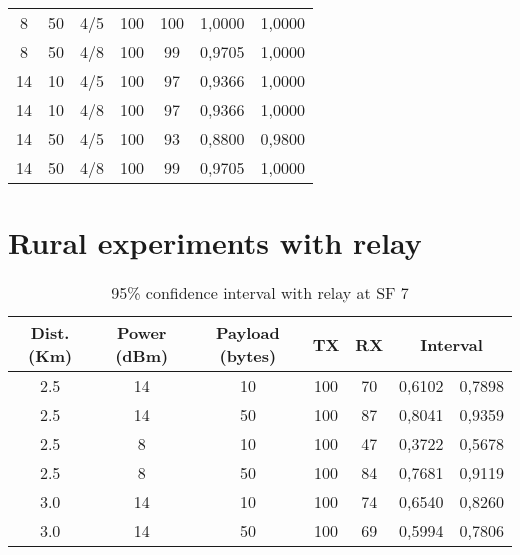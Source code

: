 \begin{table}[H]
\begin{tabular}{@{}ccccccc@{}}
8                                                     & 50                                                        & 4/5 & 100 & 100 & 1,0000        & 1,0000       \\
8                                                     & 50                                                        & 4/8 & 100 & 99  & 0,9705        & 1,0000       \\
14                                                    & 10                                                        & 4/5 & 100 & 97  & 0,9366        & 1,0000       \\
14                                                    & 10                                                        & 4/8 & 100 & 97  & 0,9366        & 1,0000       \\
14                                                    & 50                                                        & 4/5 & 100 & 93  & 0,8800        & 0,9800       \\
14                                                    & 50                                                        & 4/8 & 100 & 99  & 0,9705        & 1,0000       \\ \bottomrule
\end{tabular}
\end{table}

\newpage
\section{Rural experiments with relay}

\begin{table}[H]
\centering
\caption{95\% confidence interval with relay at SF 7}
\label{tab:cisf7relay}
\begin{tabular}{@{}ccccccc@{}}
\toprule
Dist. (Km) & Power (dBm) & Payload (bytes) & TX  & RX & \multicolumn{2}{c}{Interval} \\ \midrule
2.5           & 14          & 10              & 100 & 70 & 0,6102        & 0,7898       \\
2.5           & 14          & 50              & 100 & 87 & 0,8041        & 0,9359       \\
2.5           & 8           & 10              & 100 & 47 & 0,3722        & 0,5678       \\
2.5           & 8           & 50              & 100 & 84 & 0,7681        & 0,9119       \\
3.0           & 14          & 10              & 100 & 74 & 0,6540        & 0,8260       \\
3.0          & 14          & 50              & 100 & 69 & 0,5994        & 0,7806       \\ \bottomrule
\end{tabular}
\end{table}


